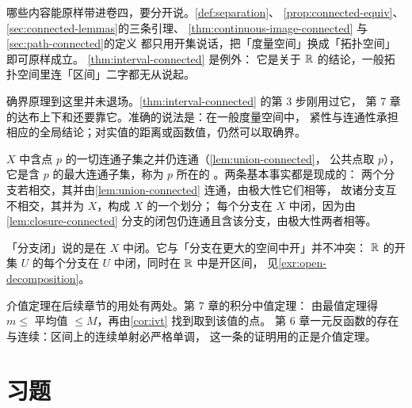 \begin{remark}
  哪些内容能原样带进卷四，要分开说。\cref{def:separation}、
  \cref{prop:connected-equiv}、\cref{sec:connected-lemmas}的三条引理、
  \cref{thm:continuous-image-connected} 与\cref{sec:path-connected}的定义
  都只用开集说话，把「度量空间」换成「拓扑空间」即可原样成立。
  \cref{thm:interval-connected} 是例外：
  它是关于 \(\mathbb{R}\) 的结论，一般拓扑空间里连「区间」二字都无从说起。
\end{remark}

\begin{remark}
  确界原理到这里并未退场。\cref{thm:interval-connected} 的第 3 步刚用过它，
  第 7 章的达布上下和还要靠它。准确的说法是：在一般度量空间中，
  紧性与连通性承担相应的全局结论；对实值的距离或函数值，仍然可以取确界。
\end{remark}

\begin{remark}[连通分支]
  \(X\) 中含点 \(p\) 的一切连通子集之并仍连通（\cref{lem:union-connected}，
  公共点取 \(p\)），它是含 \(p\) 的最大连通子集，称为 \(p\) 所在的%
  。两条基本事实都是现成的：
  两个分支若相交，其并由\cref{lem:union-connected} 连通，由极大性它们相等，
  故诸分支互不相交，其并为 \(X\)，构成 \(X\) 的一个划分；
  每个分支在 \(X\) 中闭，因为由\cref{lem:closure-connected}
  分支的闭包仍连通且含该分支，由极大性两者相等。

  「分支闭」说的是在 \(X\) 中闭。它与「分支在更大的空间中开」并不冲突：
  \(\mathbb{R}\) 的开集 \(U\) 的每个分支在 \(U\) 中闭，同时在 \(\mathbb{R}\) 中是开区间，
  见\cref{exr:open-decomposition}。
\end{remark}

\begin{remark}[去向]
  介值定理在后续章节的用处有两处。第 7 章的积分中值定理：
  由最值定理得 \(m \le\) 平均值 \(\le M\)，再由\cref{cor:ivt} 找到取到该值的点。
  第 6 章一元反函数的存在与连续：区间上的连续单射必严格单调，
  这一条的证明用的正是介值定理。
\end{remark}

\section*{习题}

